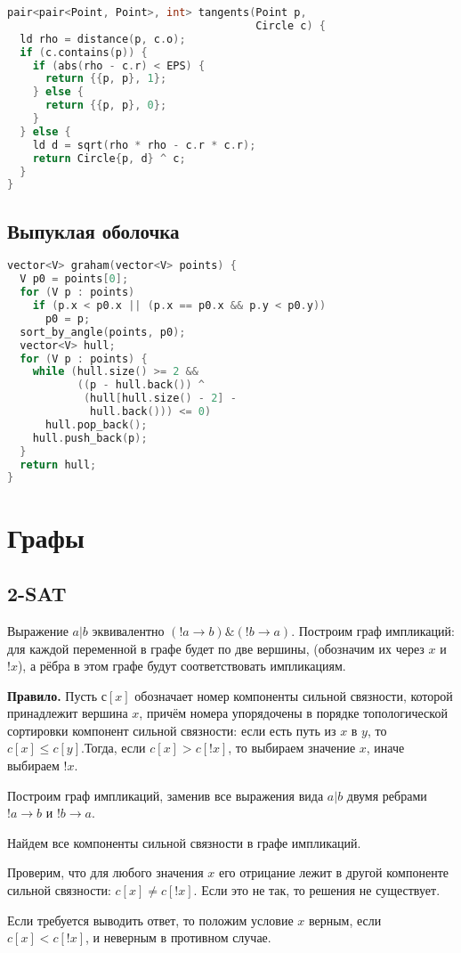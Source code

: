 \documentclass[10pt,a4paper,landscape,twosided]{extarticle}
\begin{document}
\begin{multicols}{3}
\begin{lstlisting}[language=C++]
pair<pair<Point, Point>, int> tangents(Point p,
                                       Circle c) {
  ld rho = distance(p, c.o);
  if (c.contains(p)) {
    if (abs(rho - c.r) < EPS) {
      return {{p, p}, 1};
    } else {
      return {{p, p}, 0};
    }
  } else {
    ld d = sqrt(rho * rho - c.r * c.r);
    return Circle{p, d} ^ c;
  }
}
\end{lstlisting}

\subsection{Выпуклая оболочка}
\begin{lstlisting}[language=C++]
vector<V> graham(vector<V> points) {
  V p0 = points[0];
  for (V p : points)
    if (p.x < p0.x || (p.x == p0.x && p.y < p0.y))
      p0 = p;
  sort_by_angle(points, p0);
  vector<V> hull;
  for (V p : points) {
    while (hull.size() >= 2 &&
           ((p - hull.back()) ^
            (hull[hull.size() - 2] -
             hull.back())) <= 0)
      hull.pop_back();
    hull.push_back(p);
  }
  return hull;
}
\end{lstlisting}

\section{Графы}

\subsection{2-SAT}
Выражение $a | b$ эквивалентно $(!a \rightarrow b) \& (!b \rightarrow a)$. Построим
граф импликаций: для каждой переменной в графе будет по две вершины, (обозначим
их через $x$ и $!x$), а рёбра в этом графе будут соответствовать импликациям.

\textbf{Правило.} Пусть $с[x]$ обозначает номер компоненты сильной связности,
которой принадлежит вершина $x$, причём номера упорядочены в порядке топологической
сортировки компонент сильной связности: если есть путь из $x$ в $y$, то
$c[x] \leq c[y]$.Тогда, если $c[x] > c[!x]$, то выбираем значение $x$, иначе выбираем
$!x$.

\begin { enumerate } \item Построим граф импликаций, заменив все выражения вида
$a | b$ двумя ребрами $!a \rightarrow b$ и $!b \rightarrow a$. \item Найдем все
компоненты сильной связности в графе импликаций. \item Проверим, что для любого
значения $x$ его отрицание лежит в другой компоненте сильной связности:
$c[x] \neq c[!x]$. Если это не так, то решения не существует. \item Если
требуется выводить ответ, то положим условие $x$ верным, если $c[x] < c[!x]$, и неверным
в противном случае. \end { enumerate }


\end{multicols}
\end{document}
